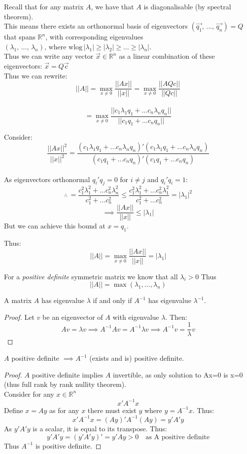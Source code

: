 \documentclass[DIV=14,titlepage=false]{scrreprt}
\begin{document}
Recall that for any \underline{} matrix \(A\), we have that \(A\) is diagonalisable (by spectral theorem). 
\\This means there exists an orthonormal basis of eigenvectors \((\vec{q_1},\, ...,\, \vec{q_n}) = Q\) that spans \(\mathbb{R}^n\), with corresponding eigenvalues \((\lambda_1,\, ...,\, \lambda_n), \, \text{where wlog} \, |\lambda_1|\geq|\lambda_2|\geq...\geq|\lambda_n|\).
\\Thus we can write any vector \(\vec{x}\in\mathbb{R}^n\) as a linear combination of these eigenvectors: \(\vec{x}=Q\vec{c}\)
\\Thus we can rewrite: \[||A||=\operatorname*{max}_{x\neq0}\frac{||Ax||}{||x||}=\operatorname*{max}_{x\neq0}\frac{||AQc||}{||Qc||}\]
\\\[=\operatorname*{max}_{x\neq0}\frac{||c_1\lambda_1q_1+...c_n\lambda_nq_n||}{||c_1q_1+...c_nq_n||}\]

Consider: \[\frac{||Ax||^2}{||x||^2}=\frac{(c_1\lambda_1q_1+...c_n\lambda_nq_n)'(c_1\lambda_1q_1+...c_n\lambda_nq_n)}{(c_1q_1+...c_nq_n)'(c_1q_1+...c_nq_n)}\]
\\
As eigenvectors orthonormal \(q_i'q_j=0\) for \(i\neq j\) and \(q_i'q_i=1\):
\[\therefore\,=\frac{c_1^2\lambda_1^2+...c_n^2\lambda_n^2}{c_1^2+...c_n^2}\leq\frac{c_1^2\lambda_1^2+...c_n^2\lambda_1^2}{c_1^2+...c_n^2}=|\lambda_1|^2\]
\[\implies \frac{||Ax||}{||x||}\leq|\lambda_1|\]
But we can achieve this bound at \(x=q_1\).
\vspace{5mm}
\begin{lemma}Thus:
\[||A||=\operatorname*{max}_{x\neq0}\frac{||Ax||}{||x||}=|\lambda_1|\]
\end{lemma}
For a \textit{positive definite} symmetric matrix we know that all \(\lambda_i>0\)
Thus \[||A||=\operatorname*{max}(\lambda_1,...,\lambda_n)\]

\begin{lemma}
    A matrix \(A\) has eigenvalue \(\lambda\) if and only if \(A^{-1}\) has eigenvalue \(\lambda^{-1}\).
\end{lemma}
\vspace{5mm}
\begin{proof}
Let \(v\) be an eigenvector of \(A\) with eigenvalue \(\lambda\). Then:
\[Av=\lambda v \implies A^{-1}Av=A^{-1}\lambda v \implies A^{-1}v = \frac{1}{\lambda}v\]
\end{proof}
\begin{lemma}
    \(A\) positive definite \(\implies A^{-1}\) (exists and is) positive definite.
\end{lemma}
\vspace{5mm}
\begin{proof}
    \(A\) positive definite implies \(A\) invertible, as only solution to Ax=0 is x=0 (thus full rank by rank nullity theorem). \\
    Consider for any \(x\in\mathbb{R}^n\) \[x'A^{-1}x\]
    Define \(x=Ay\) as for any \(x\) there must exist \(y\) where \(y=A^{-1}x\).
    Thus: \[x'A^{-1}x=(Ay)'A^{-1}(Ay)=y'A'y\]
    As \(y'A'y\) is a scalar, it is equal to its transpose. Thus:
    \[y'A'y=(y'A'y)'=y'Ay>0 \quad \text{as A positive definite}\]
    Thus \(A^{-1}\) is positive definite.
\end{proof}
\end{document}
